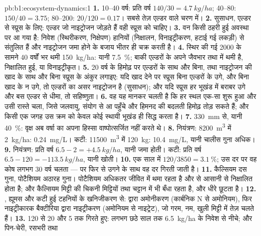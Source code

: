 \begin{solution}{pb:b1:ecosystem-dynamics:1}
\textbf{1.} 10--40 वर्ष: प्रति वर्ष $140/30 = \qty{4.7}{kg/ha}$; 40--80:
$150/40 = \num{3.75}$; 80--200: $20/120 = \num{0.17}$। सबसे तेज़
एल्डर वाले चरण में।
\textbf{2.} सुसाधन, एल्डर से स्प्रूस के लिए: एल्डर जो नाइट्रोजन
जोड़ते हैं वही स्प्रूस को चाहिए।
\textbf{3.} वन किसी ठहरी हुई अवस्था पर आ गया है: निवेश (स्थिरीकरण,
निक्षेपण) हानियों (निक्षालन, विनाइट्रीकरण, हटाई गई
लकड़ी) से संतुलित हैं और नाइट्रोजन जमा होने के बजाय भीतर ही चक्र करती है।
\textbf{4.} स्थिर की गई \num{2000} के सामने 40 वर्षों भर थमी
\qty{150}{kg/ha}: यानी \qty{7.5}{\%}; बाकी एल्डरों के अपने
जैवभार तथा  में थमी है, निक्षालित हुई, या विनाइट्रीकृत।
\textbf{5.} 20 वर्ष के हिमोढ़ पर एल्डरों के साथ और बिना, तथा नाइट्रोजन
की खाद के साथ और बिना स्प्रूस के अंकुर लगाइए: यदि खाद देने पर स्प्रूस
बिना एल्डरों के उगे, और बिना खाद के न उगे, तो
एल्डरों का असर नाइट्रोजन है (सुसाधन); और यदि स्प्रूस हर भूखंड में बराबर
उगे और बस एल्डर से धीमा, तो सहिष्णुता।
\textbf{6.} वह यह मानकर चलती है कि हर स्थल एक-सा शुरू हुआ और उसी
रास्ते चला, जिसे जलवायु, संयोग से आ पहुँचे  और हिमनद की बदलती हिमोढ़
तोड़ सकते हैं; और किसी एक जगह उस क्रम को केवल कोई स्थायी भूखंड ही सिद्ध
करता है।
\textbf{7.} \qty{330}{mm} से, यानी \qty{40}{\%}: वृक्ष अब वर्षा का अपना
हिस्सा वाष्पोत्सर्जित नहीं करते थे।
\textbf{8.} नियंत्रण: \qty{8200}{m^3} में \qty{2}{kg/ha}: \qty{0.24}{mg/L}।
कटी: \qty{11500}{m^3} में \qty{120}{kg}: \qty{10.4}{mg/L}, यानी चालीस
गुना अधिक।
\textbf{9.} नियंत्रण: प्रति वर्ष $6.5 - 2 = +\qty{4.5}{kg/ha}$, यानी जमा होती।
कटी: प्रति वर्ष $6.5 - 120 = -\qty{113.5}{kg/ha}$, यानी खोती।
\textbf{10.} एक साल में $120/3850 = \qty{3.1}{\%}$; उस दर पर वह कोष
लगभग \num{30} वर्ष चलता --- पर फिर से उगने के साथ वह दर गिरती जाती है।
\textbf{11.} कैल्सियम दस गुना, पोटैशियम अठारह गुना। पोटैशियम अधिकतर
जीवित  में थमा रहता है और  से आसानी से निक्षालित होता है; और
कैल्सियम मिट्टी की चिकनी मिट्टियों तथा चट्टान में भी बँधा रहता है, और
धीरे छूटता है।
\textbf{12.} , ह्यूमस और कटी हुई टहनियों के खनिजीकरण से:
 द्वारा अमोनीकरण (कार्बनिक N से अमोनियम), फिर
नाइट्रीकारक बैक्टीरिया द्वारा नाइट्रीकरण (अमोनियम से नाइट्रेट), जो
गरम, नम, खुली मिट्टी में तेज़ चलते हैं।
\textbf{13.} \num{120} से \num{20} और \num{5} तक गिरते हुए: लगभग छठे
साल तक \qty{6.5}{kg/ha} के निवेश से नीचे; और पिन-चेरी, रसभरी तथा

\end{solution}
